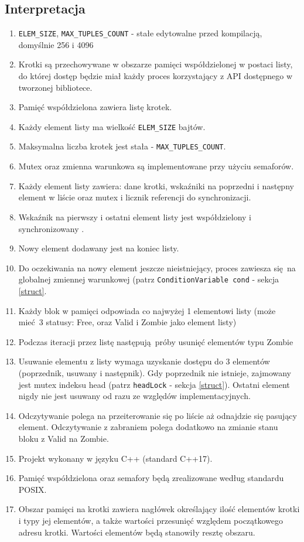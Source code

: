 \documentclass[a4paper]{article}
\begin{document}
	\subsection{Interpretacja}
	\begin{enumerate}
		\item \texttt{ELEM\_SIZE}, \texttt{MAX\_TUPLES\_COUNT} - stałe edytowalne przed kompilacją, domyślnie 256 i 4096
		\item Krotki są przechowywane w obszarze pamięci współdzielonej w postaci listy, do której dostęp będzie miał każdy proces korzystający z API dostępnego w tworzonej bibliotece.
		\item Pamięć współdzielona zawiera listę krotek.
		\item Każdy element listy ma wielkość \texttt{ELEM\_SIZE} bajtów.
		\item Maksymalna liczba krotek jest stała - \texttt{MAX\_TUPLES\_COUNT}.
        \item Mutex oraz zmienna warunkowa są implementowane przy użyciu semaforów.
		\item Każdy element listy zawiera: dane krotki, wskaźniki na poprzedni i następny element w liście oraz mutex i licznik referencji do synchronizacji.
		\item Wskaźnik na pierwszy i ostatni element listy jest współdzielony i synchronizowany .
		\item Nowy element dodawany jest na koniec listy.
        \item Do oczekiwania na nowy element jeszcze nieistniejący, proces zawiesza się na globalnej zmiennej warunkowej
            (patrz \texttt{ConditionVariable cond} - sekcja \ref{struct}.
        \item Każdy blok w pamięci odpowiada co najwyżej 1 elementowi listy (może mieć 3 statusy: Free, oraz Valid i Zombie jako element listy)
        \item Podczas iteracji przez listę następują próby usunięć elementów typu Zombie
        \item Usuwanie elementu z listy wymaga uzyskanie dostępu do 3 elementów (poprzednik, usuwany i następnik).
            Gdy poprzednik nie istnieje, zajmowany jest mutex indeksu head (patrz \texttt{headLock} - sekcja \ref{struct}).
            Ostatni element nigdy nie jest usuwany od razu ze względów implementacyjnych.
		\item Odczytywanie polega na przeiterowanie się po liście aż odnajdzie się pasujący element.
            Odczytywanie z zabraniem polega dodatkowo na zmianie stanu bloku z Valid na Zombie.
		\item Projekt wykonany w języku C++ (standard C++17).
		\item Pamięć współdzielona oraz semafory będą zrealizowane według standardu POSIX.
		\item Obszar pamięci na krotki zawiera nagłówek określający ilość elementów krotki i typy jej elementów, a także wartości przesunięć względem początkowego adresu krotki. Wartości elementów będą stanowiły resztę obszaru.
	\end{enumerate}
	
\end{document}
